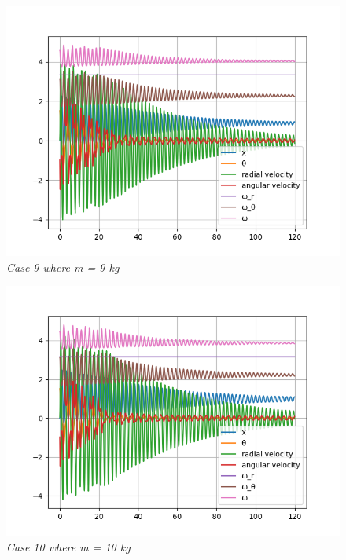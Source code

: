 \begin{figure}[H]
    \centering
    \includegraphics[width=15cm]{ExpPictures/m9.png}
    \caption{\textit{Case 9 where m = 9 kg}}
    \label{}
\end{figure}
        
\begin{figure}[H]
    \centering
    \includegraphics[width=15cm]{ExpPictures/m10.png}
    \caption{\textit{Case 10 where m = 10 kg}}
    \label{}
\end{figure}
        






